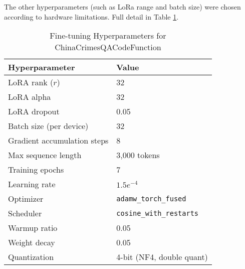 The other hyperparameters (such as LoRa range and batch size) were chosen according to hardware limitations. Full detail in Table \ref{tab:hyperparameters}.

\begin{table}[hbtp]
\centering
\small
\begin{tabular}{ll}
  \toprule
  \textbf{Hyperparameter} & \textbf{Value} \\
  \midrule
  LoRA rank ($r$) & 32 \\
  LoRA alpha & 32 \\
  LoRA dropout & 0.05 \\
Batch size (per device) & 32 \\
Gradient accumulation steps & 8 \\
Max sequence length & 3,000 tokens \\
Training epochs & 7 \\
Learning rate & $1.5e^{-4}$ \\
Optimizer & \texttt{adamw\_torch\_fused} \\
Scheduler & \texttt{cosine\_with\_restarts} \\
Warmup ratio & 0.05 \\
Weight decay & 0.05 \\
Quantization & 4-bit (NF4, double quant) \\
\bottomrule
\end{tabular}
\caption{Fine-tuning Hyperparameters for ChinaCrimesQACodeFunction}
\label{tab:hyperparameters}
\end{table}

